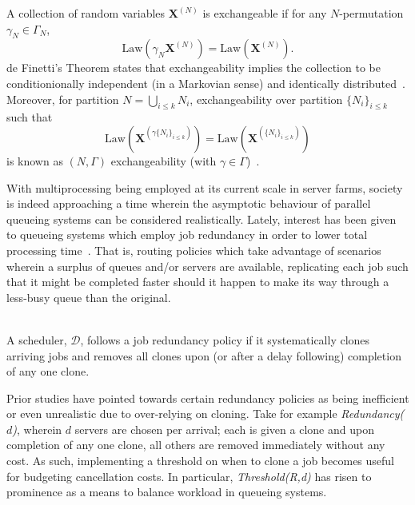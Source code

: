 \begin{definition}[Exchangeability]
    A collection of random variables $\mathbf{X}^{(N)}$ is exchangeable if for any $N$-permutation $\gamma_{N} \in \Gamma_{N}$, \[\text{Law}(\gamma_{N} \mathbf{X}^{(N)}) = \text{Law}( \mathbf{X}^{(N)}).\] de Finetti's Theorem states that exchangeability implies the collection to be conditionionally independent (in a Markovian sense) and identically distributed~\cite{austin_exchangeable_2015}.
    Moreover, for partition $N=\bigcup_{i \leq k}N_{i}$, exchangeability over partition $\{N_{i}\}_{i\leq k }$ such that
    \[
        \text{Law}(\mathbf{X}^{(\gamma\{N_{i}\}_{i\leq k })}) = \text{Law}(\mathbf{X}^{(\{N_{i}\}_{i\leq k })})
    \] is known as $(N,\Gamma)$ exchangeability (with $\gamma \in \Gamma$)~\cite{austin_exchangeable_2008}.
\end{definition}
With multiprocessing being employed at its current scale in server farms, society is indeed approaching a time wherein the asymptotic behaviour of parallel queueing systems can be considered realistically.
Lately, interest has been given to queueing systems which employ job redundancy in order to lower total processing time~\cite{ayesta_unifying_2018}.
That is, routing policies which take advantage of scenarios wherein a surplus of queues and/or servers are available, replicating each job such that it might be completed faster should it happen to make its way through a less-busy queue than the original.
\begin{definition}
    \hfill \\
    A scheduler, $\mathcal{D}$, follows a job redundancy policy if it systematically clones arriving jobs and removes all clones upon (or after a delay following) completion of any one clone.
\end{definition}
Prior studies have pointed towards certain redundancy policies as being inefficient or even unrealistic due to over-relying on cloning.
Take for example \textit{Redundancy($d$)}, wherein $d$ servers are chosen per arrival;
each is given a clone and upon completion of any one clone, all others are removed immediately without any cost.
As such, implementing a threshold on when  to clone a job becomes useful for budgeting cancellation costs.
In particular, \textit{Threshold(R,d)} has risen to prominence as a means to balance workload in queueing systems.
